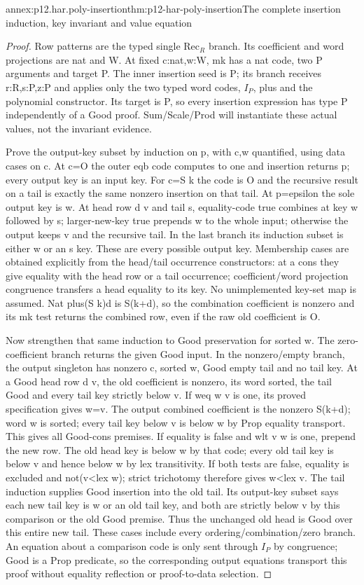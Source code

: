 \begin{annexitem}{annex:p12.har.poly-insertion}{thm:p12-har-poly-insertion}{The complete insertion induction, key invariant and value equation}
\begin{proof}
Row patterns are the typed single \(\mathrm{Rec}_R\) branch. Its coefficient and
word projections are nat and W. At fixed c:nat,w:W, mk has a
nat code, two P arguments and target P. The inner insertion seed is
P; its branch receives r:R,s:P,z:P and applies only the two typed
word codes, \(I_P\), plus and the polynomial constructor. Its target is
P, so every insertion expression has type P independently of a
Good proof. Sum/Scale/Prod will instantiate these actual values, not
the invariant evidence.

Prove the output-key subset by induction on p, with c,w quantified,
using data cases on c. At c=O the outer eqb code computes to one
and insertion returns p; every output key is an input key. For
c=S k the code is O and the recursive result on a tail is exactly
the same nonzero insertion on that tail. At p=epsilon the sole output
key is w. At head row d v and tail s, equality-code true combines
at key w followed by s; larger-new-key true prepends w to the whole
input; otherwise the output keeps v and the recursive tail. In the
last branch its induction subset is either w or an s key. These are
every possible output key. Membership cases are obtained explicitly
from the head/tail occurrence constructors: at a cons they give
equality with the head row or a tail occurrence; coefficient/word
projection congruence transfers a head equality to its key. No
unimplemented key-set map is assumed. Nat plus(S k)d is S(k+d),
so the combination coefficient is nonzero and its mk test returns
the combined row, even if the raw old coefficient is O.

Now strengthen that same induction to Good preservation for sorted w.
The zero-coefficient branch returns the given Good input. In the
nonzero/empty branch, the output singleton has nonzero c, sorted w,
Good empty tail and no tail key. At a Good head row d v, the old
coefficient is nonzero, its word sorted, the tail Good and every tail
key strictly below v. If weq w v is one, its proved specification
gives w=v. The output combined coefficient is the nonzero S(k+d);
word w is sorted; every tail key below v is below w by Prop equality
transport. This gives all Good-cons premises. If equality is false
and wlt v w is one, prepend the new row. The old head key is below
w by that code; every old tail key is below v and hence below w by
lex transitivity. If both tests are false, equality is excluded and
not(v<lex w); strict trichotomy therefore gives w<lex v. The tail
induction supplies Good insertion into the old tail. Its output-key
subset says each new tail key is w or an old tail key, and both are
strictly below v by this comparison or the old Good premise. Thus
the unchanged old head is Good over this entire new tail. These cases
include every ordering/combination/zero branch. An equation about a
comparison code is only sent through \(I_P\) by congruence; Good is a
Prop predicate, so the corresponding output equations transport this
proof without equality reflection or proof-to-data selection.


\end{proof}
\end{annexitem}
